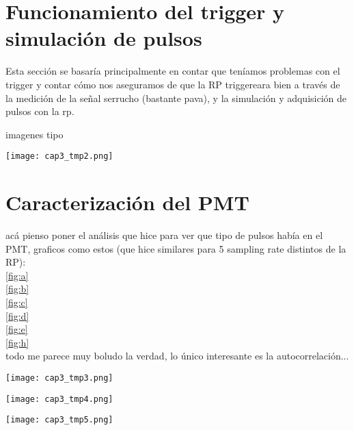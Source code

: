 
\section{Funcionamiento del trigger y simulación de pulsos}

Esta sección se basaría principalmente en contar que teníamos problemas con el trigger y contar cómo nos aseguramos de que la RP triggereara bien a través de la medición de la señal serrucho (bastante pava), y la simulación y adquisición de pulsos con la rp.

imagenes tipo

\begin{figure*}[h]
    \texttt{[image: cap3\_tmp2.png]}
\end{figure*}


\section{Caracterización del PMT}

acá pienso poner el análisis que hice para ver que tipo de pulsos había en el PMT, graficos como estos (que hice similares para 5 sampling rate distintos de la RP): \\
\ref{fig:a} \\
\ref{fig:b} \\
\ref{fig:c} \\
\ref{fig:d} \\
\ref{fig:e} \\
\ref{fig:h} \\

todo me parece muy boludo la verdad, lo único interesante es la autocorrelación...

\begin{figure*}[h]
    \texttt{[image: cap3\_tmp3.png]}
    \label{fig:a}
\end{figure*}

\begin{figure*}[h]
    \texttt{[image: cap3\_tmp4.png]}
    \caption{picos raros que aparecen a veces}
    \label{fig:b}
\end{figure*}

\begin{figure*}[h]
    \texttt{[image: cap3\_tmp5.png]}
    \caption{histograma de la altura de los picos}
    \label{fig:c}
\end{figure*}

